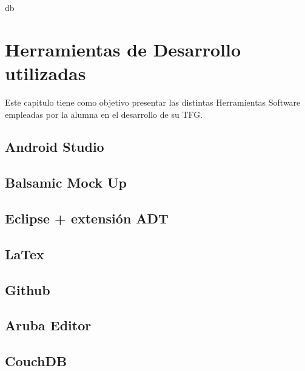 db
%
%
%


\chapter{Herramientas de Desarrollo utilizadas} \label{chap:HerramientasSoftware}

Este capitulo tiene como objetivo presentar las distintas Herramientas Software empleadas por la alumna en el desarrollo de su TFG.

\section{Android Studio}


\section{Balsamic Mock Up}


\section{Eclipse + extensión ADT}

\section{LaTex}

\section{Github}

\section{Aruba Editor}

\section{CouchDB}

